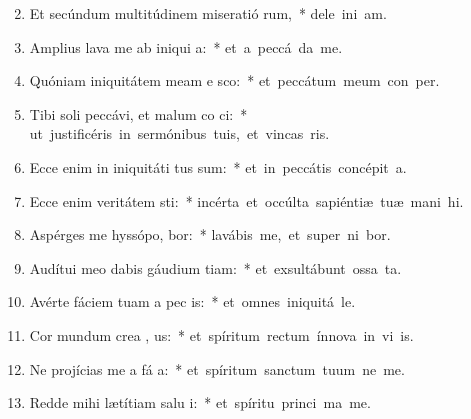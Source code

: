 \begin{flushleft}
\begin{enumerate}[leftmargin=*]
\setcounter{enumi}{1}


\item Et secúndum multitúdinem miseratió rum,~* \mbox{dele ini am.}
\item Amplius lava me ab iniqui a:~* \mbox{et a peccá  da me.}
\item Quóniam iniquitátem meam e sco:~* \mbox{et peccátum meum con   per.}
\item Tibi soli peccávi, et malum co  ci:~* \mbox{ut justificéris in sermónibus tuis, et vincas  ris.}
\item Ecce enim in iniquitáti tus sum:~* \mbox{et in peccátis concépit   a.}
\item Ecce enim veritátem sti:~* \mbox{incérta et occúlta sapiéntiæ tuæ mani hi.}
\item Aspérges me hyssópo,  bor:~* \mbox{lavábis me, et super ni bor.}
\item Audítui meo dabis gáudium  tiam:~* \mbox{et exsultábunt ossa ta.}
\item Avérte fáciem tuam a pec is:~* \mbox{et omnes iniquitá  le.}
\item Cor mundum crea  , us:~* \mbox{et spíritum rectum ínnova in vi is.}
\item Ne projícias me a fá a:~* \mbox{et spíritum sanctum tuum ne   me.}
\item Redde mihi lætítiam salu i:~* \mbox{et spíritu princi ma me.}

\end{enumerate}
\end{flushleft}
